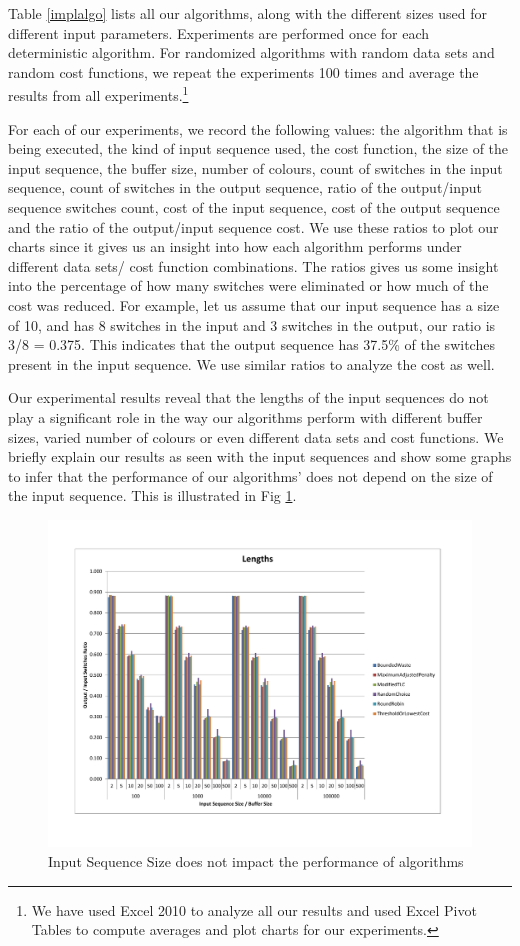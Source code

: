 Table \ref{implalgo} lists all our algorithms, along with the different sizes used for different input parameters. Experiments are performed once for each deterministic algorithm. For randomized algorithms with random data sets and random cost functions, we repeat the experiments 100 times and average the results from all experiments.\footnote{We have used Excel 2010 to analyze all our results and used Excel Pivot Tables to compute averages and plot charts for our experiments.} 

For each of our experiments, we record the following values: the algorithm that is being executed, the kind of input sequence used, the cost function, the size of the input sequence, the buffer size, number of colours, count of switches in the input sequence, count of switches in the output sequence, ratio of the output/input sequence switches count, cost of the input sequence, cost of the output sequence and the ratio of the output/input sequence cost. We use these ratios to plot our charts since it gives us an insight into how each algorithm performs under different data sets/ cost function combinations. The ratios gives us some insight into the percentage of how many switches were eliminated or how much of the cost was reduced. For example, let us assume that our input sequence has a size of 10, and has 8 switches in the input and 3 switches in the output, our ratio is 3/8 = 0.375. This indicates that the output sequence has 37.5\% of the switches present in the input sequence. We use similar ratios to analyze the cost as well.

Our experimental results reveal that the lengths of the input sequences do not play a significant role in the way our algorithms perform with different buffer sizes, varied number of colours or even different data sets and cost functions. We briefly explain our results as seen with the input sequences and show some graphs to infer that the performance of our algorithms' does not depend on the size of the input sequence. This is illustrated in Fig \ref{lengthsImpact}. 

\begin{figure}[ht]
\centering 
\includegraphics[scale=0.60]{Lengths.pdf}
\caption{Input Sequence Size does not impact the performance of algorithms}
\label{lengthsImpact}
\end{figure}

